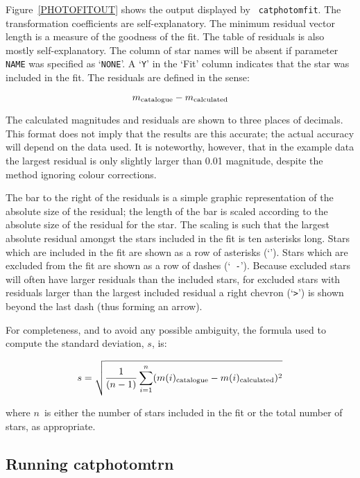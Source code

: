 \documentclass[twoside,11pt]{article}
\renewcommand{\_}{\texttt{\symbol{95}}}
\begin{document}
Figure~\ref{PHOTOFITOUT} shows the output displayed by {\tt
catphotomfit}.  The transformation coefficients are self-explanatory.
The minimum residual vector length is a measure of the goodness of the
fit.  The table of residuals is also mostly self-explanatory.  The column
of star names will be absent if parameter {\tt NAME} was specified as
`{\tt NONE}'.  A `{\tt Y}' in the `Fit' column indicates that the star
was included in the fit.  The residuals are defined in the sense:

\begin{equation}
m_{\rm catalogue} - m_{\rm calculated}
\end{equation}

The calculated magnitudes and residuals are shown to three places of
decimals.  This format does not imply that the results are this
accurate; the actual accuracy will depend on the data used.  It is
noteworthy, however, that in the example data the largest residual is
only slightly larger than 0.01 magnitude, despite the method ignoring
colour corrections.

The bar to the right of the residuals is a simple graphic
representation of the absolute size of the residual; the length of the
bar is scaled according to the absolute size of the residual for the
star.  The scaling is such that the largest absolute residual amongst
the stars included in the fit is ten asterisks long.  Stars which are
included in the fit are shown as a row of asterisks (`{\tt *}').  Stars
which are excluded from the fit are shown as a row of dashes (`{\tt
-}').  Because excluded stars will often have larger residuals than the
included stars, for excluded stars with residuals larger than the
largest included residual a right chevron (`\verb->-') is shown beyond
the last dash (thus forming an arrow).

For completeness, and to avoid any possible ambiguity, the formula used
to compute the standard deviation, $s$, is:

\begin{equation}
s = \sqrt{ \frac{1}{(n - 1)} 
    \sum_{i=1}^{n} (m(i)_{\rm catalogue} - m(i)_{\rm calculated})^2 }
\end{equation}

where $n$\, is either the number of stars included in the fit or the
total number of stars, as appropriate.

\subsection{Running catphotomtrn}
\end{document}
